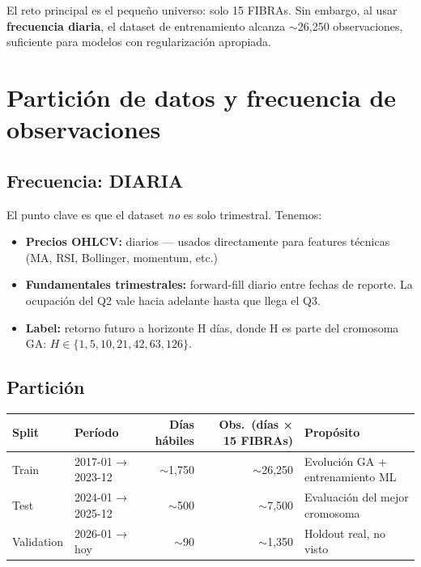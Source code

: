 \documentclass[12pt,letterpaper]{article}
\begin{document}
El reto principal es el pequeño universo: solo 15 FIBRAs. Sin embargo, al usar
\textbf{frecuencia diaria}, el dataset de entrenamiento alcanza $\sim$26{,}250
observaciones, suficiente para modelos con regularización apropiada.

\section{Partición de datos y frecuencia de observaciones}

\subsection{Frecuencia: DIARIA}

El punto clave es que el dataset \emph{no} es solo trimestral. Tenemos:

\begin{itemize}[leftmargin=2em]
  \item \textbf{Precios OHLCV:} diarios — usados directamente para features técnicas
        (MA, RSI, Bollinger, momentum, etc.)
  \item \textbf{Fundamentales trimestrales:} forward-fill diario entre fechas de
        reporte. La ocupación del Q2 vale hacia adelante hasta que llega el Q3.
  \item \textbf{Label:} retorno futuro a horizonte H días, donde H es parte del
        cromosoma GA: $H \in \{1, 5, 10, 21, 42, 63, 126\}$.
\end{itemize}

\subsection{Partición}

\begin{center}
\begin{tabular}{llrrl}
\toprule
\textbf{Split} & \textbf{Período} & \textbf{Días hábiles} &
\textbf{Obs.\ (días × 15 FIBRAs)} & \textbf{Propósito} \\
\midrule
Train      & 2017-01 → 2023-12 & $\sim$1{,}750 & $\sim$26{,}250 & Evolución GA + entrenamiento ML \\
Test       & 2024-01 → 2025-12 & $\sim$500     & $\sim$7{,}500  & Evaluación del mejor cromosoma \\
Validation & 2026-01 → hoy     & $\sim$90      & $\sim$1{,}350  & Holdout real, no visto \\
\bottomrule
\end{tabular}
\end{center}
\end{document}
